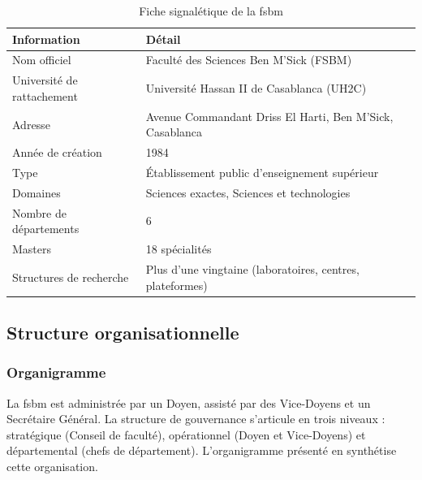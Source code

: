 \begin{table}[H]
    \centering
    \small
    \begin{xltabular}{\textwidth}{lX}
        \toprule

        \textbf{Information}       & \textbf{Détail}                                                       \\
        \midrule
        Nom officiel               & Faculté des Sciences Ben M'Sick (FSBM)                                \\
        Université de rattachement & Université Hassan II de Casablanca (UH2C)                             \\
        Adresse                    & Avenue Commandant Driss El Harti, Ben M'Sick, Casablanca              \\
        Année de création          & 1984                                                                  \\
        Type                       & Établissement public d'enseignement supérieur                         \\
        Domaines                   & Sciences exactes, Sciences et technologies                            \\
        Nombre de départements     & 6                                                                     \\
        Masters                    & 18 spécialités                                                        \\
        Structures de recherche    & Plus d'une vingtaine (laboratoires, centres, plateformes)             \\
        \bottomrule
    \end{xltabular}
    \caption{Fiche signalétique de la \acrshort{fsbm}}
    \label{tab:fsbm_fiche}
\end{table}

\subsection{Structure organisationnelle}
\label{ch1:organisation}

\subsubsection{Organigramme}
\label{ch1:organigramme}

La \acrshort{fsbm} est administrée par un Doyen, assisté par des Vice-Doyens et un Secrétaire Général. La structure de gouvernance s'articule en trois niveaux : stratégique (Conseil de faculté), opérationnel (Doyen et Vice-Doyens) et départemental (chefs de département). L'organigramme présenté en  synthétise cette organisation.

